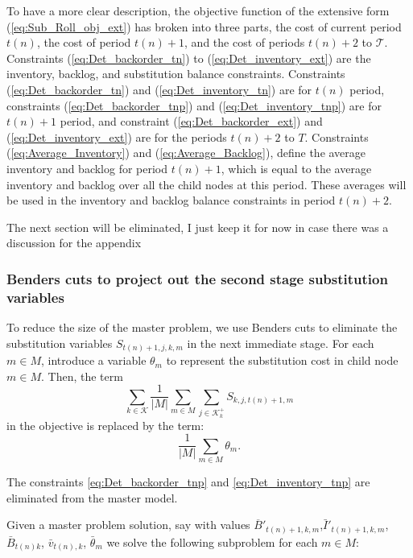 \documentclass[10pt]{article}
\newcommand{\ti}{t} %
\newcommand{\TI}{\mathcal{T}}
\newcommand{\Ti}{T}
\newcommand{\ka}{k} %
\newcommand{\KA}{\mathcal{K}}
\newcommand{\jey}{j} %
\newcommand{\Csub}{\mathcal{K}^+_k}
\newcommand{\cred}{\color{red!65!black}}
\begin{document}
 To have a more clear description, the objective function of the extensive form (\ref{eq:Sub_Roll_obj_ext}) has broken into three parts, the cost of current period $\ti(n)$, the cost of period $\ti(n)+1$, and the cost of periods $\ti(n)+2$ to $\TI$. Constraints (\ref{eq:Det_backorder_tn}) to (\ref{eq:Det_inventory_ext}) are the inventory, backlog, and substitution balance constraints. Constraints (\ref{eq:Det_backorder_tn}) and (\ref{eq:Det_inventory_tn}) are for $\ti(n)$ period, constraints (\ref{eq:Det_backorder_tnp}) and (\ref{eq:Det_inventory_tnp}) are for $\ti(n)+1$ period, and constraint (\ref{eq:Det_backorder_ext}) and (\ref{eq:Det_inventory_ext}) are for the periods $\ti(n)+2$ to $\Ti$. Constraints (\ref{eq:Average_Inventory}) and (\ref{eq:Average_Backlog}), define the average inventory and backlog for period $\ti(n)+1$, which is equal to the average inventory and backlog over all the child nodes at this period. These averages will be used in the inventory and backlog balance constraints in period $\ti(n)+2$.\\

 {\cred
\large{The next section will be eliminated, I just keep it for now in case there was a discussion for the appendix}

  \subsubsection{Benders cuts to project out the second stage substitution variables}
  
  
 To reduce the size of the master problem, we use Benders cuts to eliminate the substitution variables $S_{\ti(n)+1,\jey,\ka,m}$ in the next immediate stage. For each $m \in M$, introduce a variable $\theta_m$ to represent the substitution cost in child node $m \in M$. Then, the term 
 \[ \sum_{\ka \in \KA} \frac{1}{|M|} \sum_{m \in M} \sum_{\jey \in  \Csub} S_{k,j,\ti(n)+1,m} \]
 in the objective is replaced by the term:
 \[ \frac{1}{|M|} \sum_{m \in M} \theta_m. \]

The constraints \eqref{eq:Det_backorder_tnp} and \eqref{eq:Det_inventory_tnp} are eliminated from the master model. 

Given a master problem solution, say with values $\overline{B}'_{\ti(n)+1 , \ka,m}$,$\bar{I}'_{\ti(n)+1 , \ka,m}$,$\bar{B}_{ \ti(n) \ka}$, $\bar{v}_{\ti(n) , \ka}$, $\bar{\theta}_m$ we solve the following subproblem for each $m \in M$:

}

    
\end{document}
